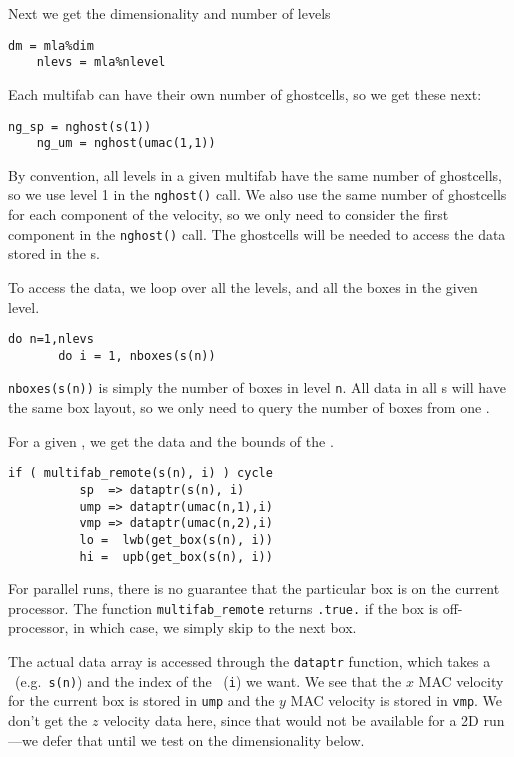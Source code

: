 Next we get the dimensionality and number of levels
\begin{lstlisting}[language={[95]fortran},mathescape=false]
    dm = mla%dim
    nlevs = mla%nlevel
\end{lstlisting}


Each multifab can have their own number of ghostcells, so we get
these next:
\begin{lstlisting}[language={[95]fortran},mathescape=false]
    ng_sp = nghost(s(1))
    ng_um = nghost(umac(1,1))
\end{lstlisting}
By convention, all levels in a given multifab have the same number of
ghostcells, so we use level 1 in the {\tt nghost()} call.  We also use
the same number of ghostcells for each component of the velocity, so
we only need to consider the first component in the {\tt nghost()}
call.  The ghostcells will be needed to access the data stored in the
\fab s.

To access the data, we loop over all the levels, and all the boxes in
the given level.
\begin{lstlisting}[language={[95]fortran},mathescape=false]
    do n=1,nlevs
       do i = 1, nboxes(s(n))
\end{lstlisting}
{\tt nboxes(s(n))} is simply the number of boxes in level {\tt n}.
All data in all \multifab s will have the same box layout, so we only
need to query the number of boxes from one \multifab.

For a given \boxtype, we get the data and the bounds of the \boxtype.
\begin{lstlisting}[language={[95]fortran},mathescape=false]
          if ( multifab_remote(s(n), i) ) cycle
          sp  => dataptr(s(n), i)
          ump => dataptr(umac(n,1),i)
          vmp => dataptr(umac(n,2),i)
          lo =  lwb(get_box(s(n), i))
          hi =  upb(get_box(s(n), i))
\end{lstlisting}

\noindent For parallel runs, there is no guarantee that the particular
box is on the current processor.  The function {\tt multifab\_remote}
returns {\tt .true.} if the box is off-processor, in which case, we 
simply skip to the next box.

The actual data array is accessed through the {\tt dataptr} function,
which takes a \multifab\ (e.g.\ {\tt s(n)}) and the index of the
\boxtype\ ({\tt i}) we want.  We see that the $x$ MAC velocity for the
current box is stored in {\tt ump} and the $y$ MAC velocity is stored
in {\tt vmp}.  We don't get the $z$ velocity data here, since that
would not be available for a 2D run---we defer that until we test on
the dimensionality below.

